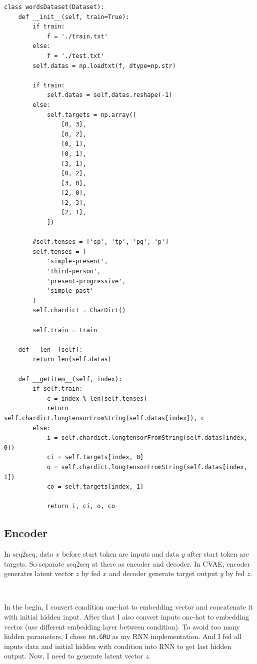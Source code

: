 \documentclass[12pt]{article}
\begin{document}
\begin{verbatim}
class wordsDataset(Dataset):
    def __init__(self, train=True):
        if train:
            f = './train.txt'
        else:
            f = './test.txt'
        self.datas = np.loadtxt(f, dtype=np.str)
        
        if train:
            self.datas = self.datas.reshape(-1)
        else:
            self.targets = np.array([
                [0, 3],
                [0, 2],
                [0, 1],
                [0, 1],
                [3, 1],
                [0, 2],
                [3, 0],
                [2, 0],
                [2, 3],
                [2, 1],
            ])
        
        #self.tenses = ['sp', 'tp', 'pg', 'p']
        self.tenses = [
            'simple-present', 
            'third-person', 
            'present-progressive', 
            'simple-past'
        ]
        self.chardict = CharDict()
        
        self.train = train
    
    def __len__(self):
        return len(self.datas)
    
    def __getitem__(self, index):
        if self.train:
            c = index % len(self.tenses)
            return self.chardict.longtensorFromString(self.datas[index]), c
        else:
            i = self.chardict.longtensorFromString(self.datas[index, 0])
            ci = self.targets[index, 0]
            o = self.chardict.longtensorFromString(self.datas[index, 1])
            co = self.targets[index, 1]
            
            return i, ci, o, co
\end{verbatim}

\subsection{Encoder}

In seq2seq, data $x$ before start token are inputs and data $y$ after start token are targets. So separate seq2seq at there as encoder and decoder. In CVAE, encoder generates latent vector $z$ by fed $x$ and decoder generate target output $y$ by fed $z$. 
\par \ \par
In the begin, I convert condition one-hot to embedding vector and concatenate it with initial hidden input. After that I also convert inputs one-hot to embedding vector (use different embedding layer between condition). To avoid too many hidden parameters, I chose \verb|nn.GRU| as my RNN implementation. And I fed all inputs data and initial hidden with condition into RNN to get last hidden output. Now, I need to generate latent vector $z$.
\end{document}
